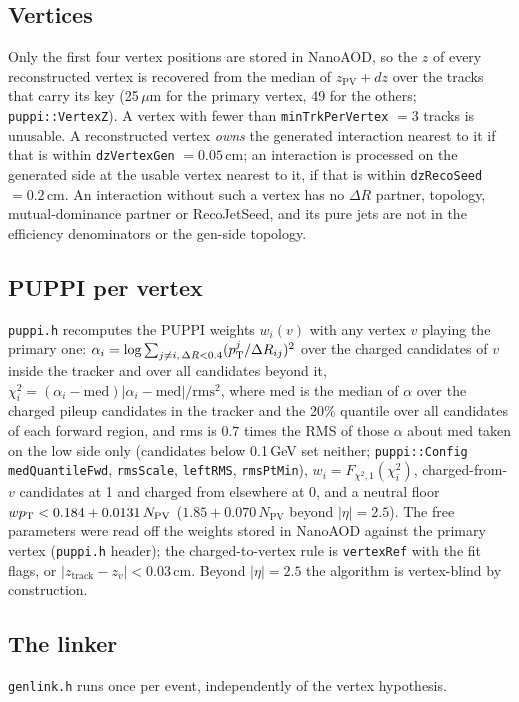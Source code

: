 \subsection{Vertices}
Only the first four vertex positions are stored in NanoAOD, so the $z$ of every
reconstructed vertex is recovered from the median of $z_{\mathrm{PV}} + dz$
over the tracks that carry its key (25\,$\mu$m for the primary vertex, 49 for
the others; \texttt{puppi::VertexZ}). A vertex with fewer than
\texttt{minTrkPerVertex} $= 3$ tracks is unusable. A reconstructed vertex
\emph{owns} the generated interaction nearest to it if that is within
\texttt{dzVertexGen} $= 0.05$\,cm; an interaction is processed on the generated
side at the usable vertex nearest to it, if that is within
\texttt{dzRecoSeed} $= 0.2$\,cm. An interaction without such a vertex has no
$\Delta R$ partner, topology, mutual-dominance partner or RecoJetSeed, and its
pure jets are not in the efficiency denominators or the gen-side topology.

\subsection{PUPPI per vertex}
\texttt{puppi.h} recomputes the PUPPI weights $w_i(v)$ with any vertex $v$
playing the primary one: $\alpha_i = \log\sum_{j\ne i,\,\Delta R<0.4}
(p_{\mathrm{T}}^j/\Delta R_{ij})^2$ over the charged candidates of $v$ inside the tracker
and over all candidates beyond it, $\chi^2_i = (\alpha_i - \mathrm{med})|\alpha_i
- \mathrm{med}|/\mathrm{rms}^2$, where med is the median of $\alpha$ over the
charged pileup candidates in the tracker and the 20\% quantile over all
candidates of each forward region, and rms is $0.7$ times the RMS of those
$\alpha$ about med taken on the low side only (candidates below 0.1\,GeV set
neither; \texttt{puppi::Config} \texttt{medQuantileFwd}, \texttt{rmsScale},
\texttt{leftRMS}, \texttt{rmsPtMin}),
$w_i = F_{\chi^2,1}(\chi^2_i)$, charged-from-$v$ candidates at 1 and charged
from elsewhere at 0, and a neutral floor $wp_{\mathrm{T}} < 0.184 + 0.0131\,N_{\mathrm{PV}}$
($1.85 + 0.070\,N_{\mathrm{PV}}$ beyond $|\eta| = 2.5$). The free parameters were
read off the weights stored in NanoAOD against the primary vertex
(\texttt{puppi.h} header); the charged-to-vertex rule is \texttt{vertexRef}
with the fit flags, or $|z_{\mathrm{track}} - z_v| < 0.03$\,cm. Beyond
$|\eta| = 2.5$ the algorithm is vertex-blind by construction.

\subsection{The linker}
\label{s:linker}
\texttt{genlink.h} runs once per event, independently of the vertex hypothesis.

